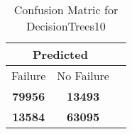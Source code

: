 \begin{table}[] 
\caption{Confusion Matric for DecisionTrees10} 
\label{Table: Prediction Accuracy-DMDDecisionTrees10OnlySunEKF-ignoreReflection100.9EKF-top2-Reflection} 
\centering 
\begin{tabular} 
 {@{}ccc@{}} 
\toprule 
\multicolumn{2}{c}{\textbf{Predicted}}
 \\ \midrule 
\multicolumn{1}{|c|}{Failure} & 
\multicolumn{1}{c|}{No Failure}
 \\ \midrule 
\multicolumn{1}{|c|}{\color{green}\textbf{79956}} & 
\multicolumn{1}{c|}{\color{red}\textbf{13493}}
 \\ \midrule 
\multicolumn{1}{|c|}{\color{red}\textbf{13584}} & 
\multicolumn{1}{c|}{\color{green}\textbf{63095}}
 \\ \bottomrule 
\end{tabular} 
\end{table} 
